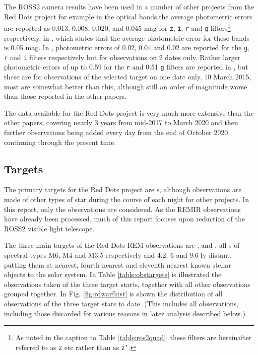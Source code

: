 The ROSS2 camera results have been used in a number of other projects from the
Red Dots project for example in \citet{frasca20} the optical bands,the average
photometric errors are reported as 0.013, 0.008, 0.020, and 0.045 mag for
\texttt{z}, \texttt{i}, \texttt{r} and \texttt{g} filters\footnote{As noted in
the caption to Table \ref{table:ros2quad}, these filters are hereinafter
referred to as \texttt{z} etc rather than as \texttt{z'}.} respectively, in
\citet{giannini20}, which states that the average photometric error for these
bands is 0.05 mag. In \citet{riverasandoval18}, photometric errors of 0.02, 0.04
and 0.02 are reported for the \texttt{g}, \texttt{r} and \texttt{i} filters
respectively but for observations on 2 dates only. Rather larger photometric
errors of up to 0.59 for the \texttt{r} and 0.51 \texttt{g} filters are reported
in \citet{pastorello15}, but these are for observations of the selected target
on one date only, 10 March 2015, most are somewhat better than this, although
still an order of magnitude worse than those reported in the other papers.

The data available for the Red Dots project is very much more extensive than the
other papers, covering nearly 3 years from mid-2017 to March 2020 and then
further observations being added every day from the end of October 2020
continuing through the present time.

\subsection{Targets}

The primary targets for the Red Dots project are \rdwarf s, although
observations are made of other types of star during the course of each night
for other projects. In this report, only the {\rdwarf} observations are
considered. As the REMIR observations have already been processed, much of this report
focuses upon reduction of the ROSS2 visible light telescope.

The three main targets of the Red Dots REM observations are \prox, {\bstar} and
\ross, all \rdwarf s of spectral types M6, M4 and M3.5 respectively and 4.2, 6
and 9.6 ly distant, putting them at nearest, fourth nearest and eleventh nearest known
stellar objects to the solar system. In Table \ref{table:obstargets} is
illustrated the observations taken of the three target {\rdwarf} starts,
together with all other observations grouped together. In Fig.
\ref{fig:rdwarfhist} is shown the distribution of all observations of the three
target stars to date. (This includes all observations, including those
discarded for various reasons in later analysis described below.)

